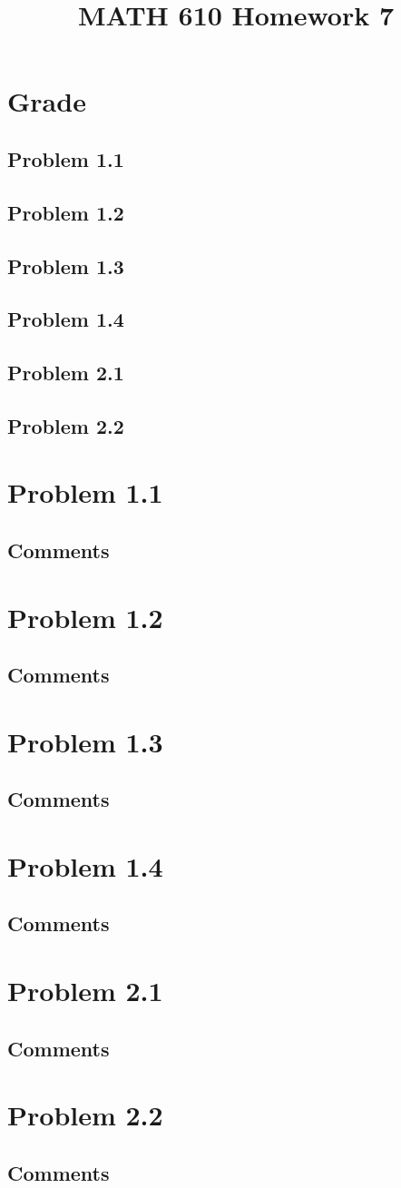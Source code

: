 \documentclass{article}
\title{MATH 610 Homework 7}
\author{
}
\date{}
\newcommand{\problem}[2]{
    \section*{Problem #1}
    {#2}
    \vfill
    \subsection*{Comments}
    \newpage
}
\begin{document}
\maketitle
\newpage

\section*{Grade}
\subsection*{Problem 1.1}
\subsection*{Problem 1.2}
\subsection*{Problem 1.3}
\subsection*{Problem 1.4}
\subsection*{Problem 2.1}
\subsection*{Problem 2.2}
\newpage

\problem{1.1}{
}

\problem{1.2}{
}

\problem{1.3}{
}

\problem{1.4}{
}

\problem{2.1}{
}

\problem{2.2}{
}
\end{document}
